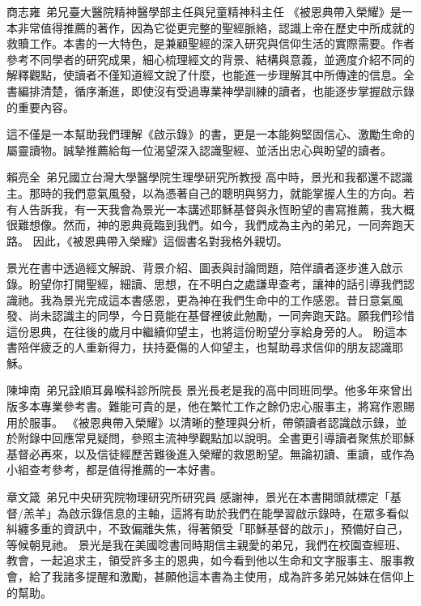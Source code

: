 \begin{Recommendation}{商志雍\ 弟兄}{臺大醫院精神醫學部主任與兒童精神科主任}
《被恩典帶入榮耀》是一本非常值得推薦的著作，因為它從更完整的聖經脈絡，認識上帝在歷史中所成就的救贖工作。本書的一大特色，是兼顧聖經的深入研究與信仰生活的實際需要。作者參考不同學者的研究成果，細心梳理經文的背景、結構與意義，並適度介紹不同的解釋觀點，使讀者不僅知道經文說了什麼，也能進一步理解其中所傳達的信息。全書編排清楚，循序漸進，即使沒有受過專業神學訓練的讀者，也能逐步掌握啟示錄的重要內容。

這不僅是一本幫助我們理解《啟示錄》的書，更是一本能夠堅固信心、激勵生命的屬靈讀物。誠摯推薦給每一位渴望深入認識聖經、並活出忠心與盼望的讀者。
\end{Recommendation}

\begin{Recommendation}{賴亮全\ 弟兄}{國立台灣大學醫學院生理學研究所教授}
高中時，景光和我都還不認識主。那時的我們意氣風發，以為憑著自己的聰明與努力，就能掌握人生的方向。若有人告訴我，有一天我會為景光一本講述耶穌基督與永恆盼望的書寫推薦，我大概很難想像。然而，神的恩典竟臨到我們。如今，我們成為主內的弟兄，一同奔跑天路。
因此，《被恩典帶入榮耀》這個書名對我格外親切。

景光在書中透過經文解說、背景介紹、圖表與討論問題，陪伴讀者逐步進入啟示錄。盼望你打開聖經，細讀、思想，在不明白之處謙卑查考，讓神的話引導我們認識祂。我為景光完成這本書感恩，更為神在我們生命中的工作感恩。昔日意氣風發、尚未認識主的同學，今日竟能在基督裡彼此勉勵，一同奔跑天路。願我們珍惜這份恩典，在往後的歲月中繼續仰望主，也將這份盼望分享給身旁的人。
盼這本書陪伴疲乏的人重新得力，扶持憂傷的人仰望主，也幫助尋求信仰的朋友認識耶穌。
\end{Recommendation}

\begin{Recommendation}{陳坤南\ 弟兄}{詮順耳鼻喉科診所院長}
景光長老是我的高中同班同學。他多年來曾出版多本專業參考書。難能可貴的是，他在繁忙工作之餘仍忠心服事主，將寫作恩賜用於服事。
《被恩典帶入榮耀》以清晰的整理與分析，帶領讀者認識啟示錄，並於附錄中回應常見疑問，參照主流神學觀點加以說明。全書更引導讀者聚焦於耶穌基督必再來，以及信徒經歷苦難後進入榮耀的救恩盼望。無論初讀、重讀，或作為小組查考參考，都是值得推薦的一本好書。
\end{Recommendation}

\begin{Recommendation}{章文箴\ 弟兄}{中央研究院物理研究所研究員}
感謝神，景光在本書開頭就標定「基督/羔羊」為啟示錄信息的主軸，這將有助於我們在能學習啟示錄時，在眾多看似糾纏多重的資訊中，不致偏離失焦，得著領受「耶穌基督的啟示」，預備好自己，等候朝見祂。
景光是我在美國唸書同時期信主親愛的弟兄，我們在校園查經班、教會，一起追求主，領受許多主的恩典，如今看到他以生命和文字服事主、服事教會，給了我諸多提醒和激勵，甚願他這本書為主使用，成為許多弟兄姊妹在信仰上的幫助。
\end{Recommendation}
